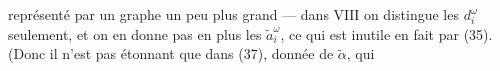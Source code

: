 représenté par un graphe un peu plus grand --- dans $\boxed{\mathrm{VIII}}$ on distingue les   $d_i^\omega$ seulement, et on en donne pas en plus les $\widetilde a_i^\omega$, ce qui est inutile en fait par (35). (Donc il n'est pas étonnant que dans (37),  donnée de $\widetilde\alpha$, qui
